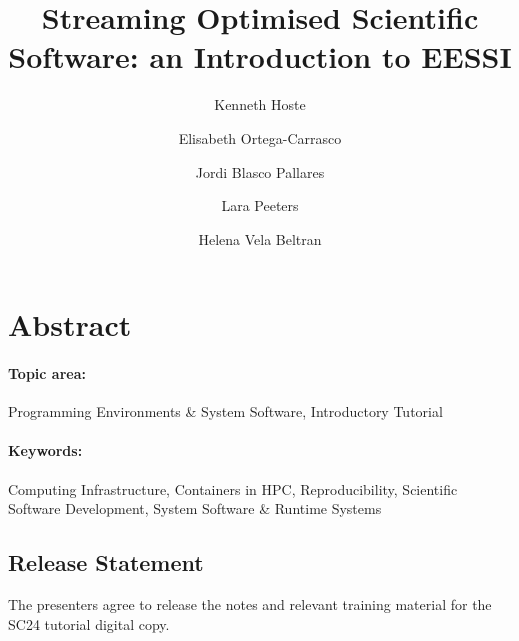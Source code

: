 \documentclass[a4paper,11pt]{article}
\begin{document}

\title{
    \textbf{\LARGE Streaming Optimised Scientific Software: an Introduction to EESSI}\\
}

\date{}

\author[1]{Kenneth Hoste}
\author[2]{Elisabeth Ortega-Carrasco}
\author[2]{Jordi Blasco Pallares}
\author[1]{Lara Peeters}
\author[2]{Helena Vela Beltran}

\renewcommand\Authands{ and }

\maketitle


\section*{Abstract}


\paragraph{Topic area:} Programming Environments \& System Software, Introductory Tutorial

\paragraph{Keywords:} Computing Infrastructure, Containers in HPC, Reproducibility, Scientific Software Development, System Software \& Runtime Systems


\newpage




\newpage

\subsection*{Release Statement}

The presenters agree to release the notes and relevant training material for the SC24 tutorial digital copy.


\end{document}
